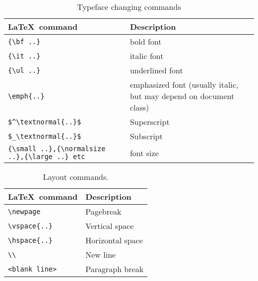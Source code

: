 \documentclass{article}
\begin{document}
\begin{table}[htbp]
\caption{Typeface changing commands}
\begin{tabularx}{\textwidth}{lX}
\toprule
\LaTeX~command & Description \\
\midrule
\verb|{\bf ..}| & bold font\\
\verb|{\it ..}| & italic font\\
\verb|{\ul ..}| & underlined font\\
\verb|\emph{..}| & emphasized font (usually italic, but may depend on document class)\\
\verb|$^\textnormal|\verb|{..}$| & Superscript \\
\verb|$_\textnormal|\verb|{..}$| & Subscript \\
\verb|{\small ..},{\normalsize ..},{\large ..} etc| & font size\\
\bottomrule
\end{tabularx}
\end{table}


\begin{table}[htbp]
\caption{Layout commands.}
\begin{tabularx}{\textwidth}{ll}
\toprule
\LaTeX~command & Description \\
\midrule
\verb|\newpage| & Pagebreak\\
\verb|\vspace|\verb|{..}| & Vertical space\\
\verb|\hspace|\verb|{..}| & Horizontal space\\
\verb|\\| & New line\\
\verb|<blank line>| & Paragraph break \\
\bottomrule
\end{tabularx}
\end{table}
\end{document}
